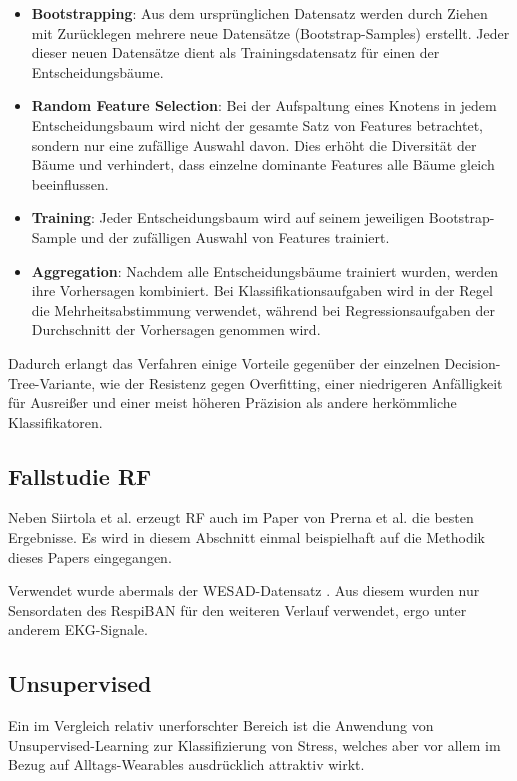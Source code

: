 \begin{itemize}
    \item \textbf{Bootstrapping}: Aus dem ursprünglichen Datensatz werden durch Ziehen mit Zurücklegen mehrere neue Datensätze (Bootstrap-Samples) erstellt. Jeder dieser neuen Datensätze dient als Trainingsdatensatz für einen der Entscheidungsbäume.
    \item \textbf{Random Feature Selection}: Bei der Aufspaltung eines Knotens in jedem Entscheidungsbaum wird nicht der gesamte Satz von Features betrachtet, sondern nur eine zufällige Auswahl davon. Dies erhöht die Diversität der Bäume und verhindert, dass einzelne dominante Features alle Bäume gleich beeinflussen.
    \item \textbf{Training}: Jeder Entscheidungsbaum wird auf seinem jeweiligen Bootstrap-Sample und der zufälligen Auswahl von Features trainiert.
    \item \textbf{Aggregation}: Nachdem alle Entscheidungsbäume trainiert wurden, werden ihre Vorhersagen kombiniert. Bei Klassifikationsaufgaben wird in der Regel die Mehrheitsabstimmung verwendet, während bei Regressionsaufgaben der Durchschnitt der Vorhersagen genommen wird.
\end{itemize}

Dadurch erlangt das Verfahren einige Vorteile gegenüber der einzelnen Decision-Tree-Variante, wie der Resistenz gegen Overfitting, einer niedrigeren Anfälligkeit für Ausreißer und einer meist höheren Präzision als andere herkömmliche Klassifikatoren.

\subsection{Fallstudie RF}

Neben Siirtola et al. \cite{Siirtola2019} erzeugt \ac{RF} auch im Paper von Prerna et al. \cite{Prerna2021} die besten Ergebnisse. Es wird in diesem Abschnitt einmal beispielhaft auf die Methodik dieses Papers eingegangen.

Verwendet wurde abermals der WESAD-Datensatz \cite{Schmidt2018WESAD}. Aus diesem wurden nur Sensordaten des RespiBAN für den weiteren Verlauf verwendet, ergo unter anderem \ac{EKG}-Signale.

\subsection{Unsupervised}

Ein im Vergleich relativ unerforschter Bereich ist die Anwendung von Unsupervised-Learning zur Klassifizierung von Stress, welches aber vor allem im Bezug auf Alltags-Wearables ausdrücklich attraktiv wirkt.

